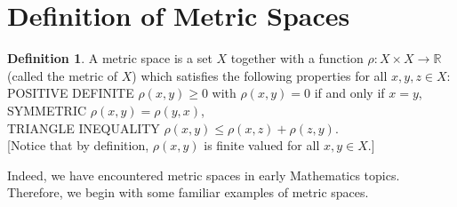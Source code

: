 \documentclass[12pt, reqno]{amsart}
\theoremstyle{definition}
\newtheorem{definition}[theorem]{Definition}
\numberwithin{equation}{section}
\newcommand{\dR}{{\mathbb R}}
\newcommand{\vsp}{\vspace{0.5cm}}
\begin{document}
\section{Definition of Metric Spaces}

    \begin{definition} \cite{s1}
        A metric space is a set $X$ together with a function $\rho: X \times X \longrightarrow \dR$ (called the metric of $X$) which satisfies the following properties for all $x, y, z \in X$:
        \vsp\\
        \hspace*{1cm} POSITIVE DEFINITE \hspace{1cm} $\rho(x, y) \geq 0$ with $\rho(x, y) = 0$ if and only if $x = y$, \\
        \hspace*{2.6cm} SYMMETRIC \hspace{1cm} $\rho(x, y) = \rho(y, x)$, \\
        \hspace*{0.2cm} TRIANGLE INEQUALITY \hspace{1cm} $\rho(x, y) \leq \rho(x, z) +\rho(z, y)$.
        \vsp\\
        {[Notice that by definition, $\rho(x, y)$ is finite valued for all $x, y \in X$.]}\\
    \end{definition}
    
    Indeed, we have encountered metric spaces in early Mathematics topics. Therefore, we begin with some familiar examples of metric spaces.
    
\end{document}
